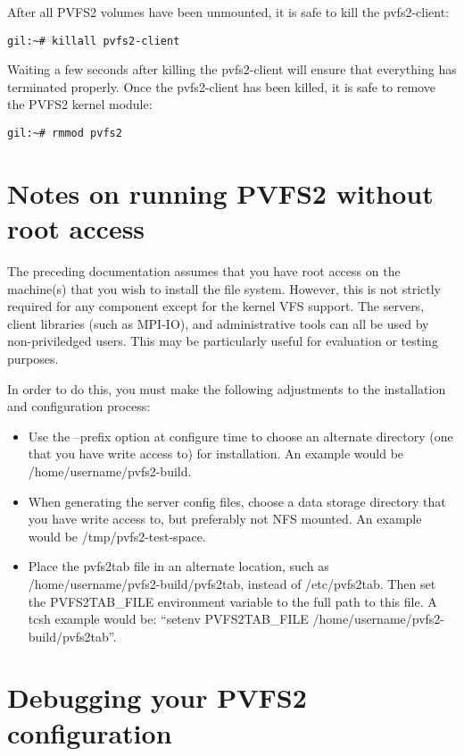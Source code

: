 \documentclass[11pt, letterpaper]{article}
\begin{document}
After all PVFS2 volumes have been unmounted, it is safe to kill the
pvfs2-client:
\begin{verbatim}
gil:~# killall pvfs2-client
\end{verbatim}

Waiting a few seconds after killing the pvfs2-client will ensure that
everything has terminated properly.  Once the pvfs2-client has been
killed, it is safe to remove the PVFS2 kernel module:
\begin{verbatim}
gil:~# rmmod pvfs2
\end{verbatim}

\appendix

\section{Notes on running PVFS2 without root access}

The preceding documentation assumes that you have root access on the
machine(s) that you wish to install the file system.  However, this is
not strictly required for any component except for the kernel VFS
support.  The servers, client libraries (such as MPI-IO), and
administrative tools can all be used by non-priviledged users.  This
may be particularly useful for evaluation or testing purposes.

In order to do this, you must make the following adjustments to the
installation and configuration process:
\begin{itemize}
\item Use the --prefix option at configure time to choose an alternate
directory (one that you have write access to) for installation.  An example
would be /home/username/pvfs2-build.
\item When generating the server config files, choose a data storage
directory that you have write access to, but preferably not NFS mounted.  An
example would be /tmp/pvfs2-test-space.
\item Place the pvfs2tab file in an alternate location, such as
/home/username/pvfs2-build/pvfs2tab, instead of /etc/pvfs2tab.
Then set the PVFS2TAB\_FILE environment variable to the full path
to this file.  A tcsh example would be: ``setenv PVFS2TAB\_FILE
/home/username/pvfs2-build/pvfs2tab''.
\end{itemize}


\section{Debugging your PVFS2 configuration}
\end{document}
